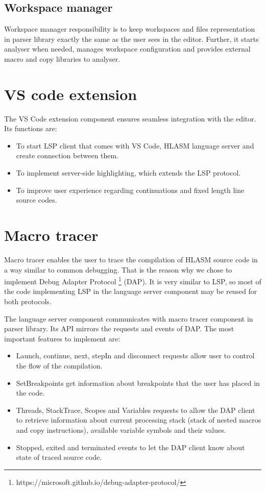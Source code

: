 \subsection{Workspace manager}

Workspace manager responsibility is to keep workspaces and files representation in parser library exactly the same as the user sees in the editor. Further, it starts analyser when needed, manages workspace configuration and provides external macro and copy libraries to analyser.

\section{VS code extension}

The VS Code extension component ensures seamless integration with the editor. Its functions are:

\begin{itemize}
	\item To start LSP client that comes with VS Code, HLASM language server and create connection between them.
	\item To implement server-side highlighting, which extends the LSP protocol.
	\item To improve user experience regarding continuations and fixed length line source codes.
\end{itemize}


\section{Macro tracer}
Macro tracer enables the user to trace the compilation of HLASM source code in a way similar to common debugging. That is the reason why we chose to implement Debug Adapter Protocol \footnote{https://microsoft.github.io/debug-adapter-protocol/} (DAP). It is very similar to LSP, so most of the code implementing LSP in the language server component may be reused for both protocols.

The language server component communicates with macro tracer component in parser library. Its API mirrors the requests and events of DAP. The most important features to implement are:

\begin{itemize}
	\item Launch, continue, next, stepIn and disconnect requests allow user to control the flow of the compilation.
	\item SetBreakpoints get information about breakpoints that the user has placed in the code.
	\item Threads, StackTrace, Scopes and Variables requests to allow the DAP client to retrieve information about current processing stack (stack of nested macros and copy instructions), available variable symbols and their values.
	\item Stopped, exited and terminated events to let the DAP client know about state of traced source code.
\end{itemize}


